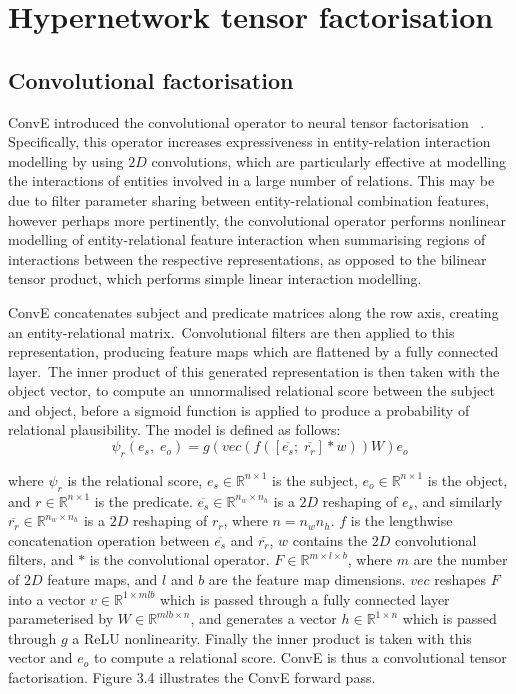\section{Hypernetwork tensor factorisation}

\subsection{Convolutional factorisation}

ConvE introduced the convolutional operator to neural tensor factorisation \unskip ~\citep{dettmers2018convolutional}. Specifically, this operator increases expressiveness in entity-relation interaction modelling by using $ 2D $ convolutions, which are particularly effective at modelling the interactions of entities involved in a large number of relations. This may be due to filter parameter sharing between entity-relational combination features, however perhaps more pertinently, the convolutional operator performs nonlinear modelling of entity-relational feature interaction when summarising regions of interactions between the respective representations, as opposed to the bilinear tensor product, which performs simple linear interaction modelling. \par

\noindent ConvE concatenates subject and predicate matrices along the row axis, creating an entity-relational matrix.\ Convolutional filters are then applied to this representation, producing feature maps which are flattened by a fully connected layer.\ The inner product of this generated representation is then taken with the object vector, to compute an unnormalised relational score between the subject and object, before a sigmoid function is applied to produce a probability of relational plausibility. The model is defined as follows:
\begin{equation}
	\psi_r(e_s, \; e_o) = g(vec(f(\left [ \overline{e_s}; \; \overline{r_r} \right ]*w))W)e_o
\end{equation}

\noindent where $ \psi_r $ is the relational score, $ e_s \in \mathbb{R}^{n \times 1} $ is the subject, $ e_o \in \mathbb{R}^{n \times 1} $ is the object, and $ r \in \mathbb{R}^{n \times 1} $ is the predicate. $ \overline{e_s} \in \mathbb{R}^{n_w \times n_h} $ is a $ 2D $ reshaping of $ e_s $, and similarly $ \overline{r_r} \in \mathbb{R}^{n_w \times n_h} $ is a $ 2D $ reshaping of $ r_r $, where $ n = n_wn_h $. $ f $ is the lengthwise concatenation operation between $ \overline{e_s} $ and $ \overline{r_r} $, $ w $ contains the $ 2D $ convolutional filters, and $ * $ is the convolutional operator.  $ F \in \mathbb{R}^{m \times l \times b} $, where $ m $ are the number of $ 2D $ feature maps, and $ l $ and $ b $ are the feature map dimensions. $ vec $ reshapes $ F $ into a vector $ v \in \mathbb{R}^{1 \times mlb}$ which is passed through a fully connected layer parameterised by $ W \in \mathbb{R}^{mlb \times n} $, and generates a vector $ h \in \mathbb{R}^{1 \times n} $ which is passed through $ g $ a ReLU nonlinearity. Finally the inner product is taken with this vector and $ e_o $ to compute a relational score. ConvE is thus a convolutional tensor factorisation. Figure 3.4 illustrates the ConvE forward pass.

